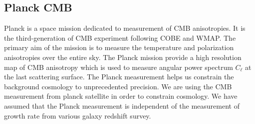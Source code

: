 \subsection{Planck CMB}
Planck is a space mission dedicated to measurement of CMB anisotropies.  It is the third-generation of CMB experiment following COBE and WMAP. The primary aim of the mission is to measure the temperature and polarization anisotropies over the entire sky. The Planck mission provide a high resolution map of CMB anisotropy which is used to measure angular power spectrum $C_\ell$ at the last scattering surface. The Planck measurement helps us constrain the background cosmology to unprecedented precision. We are using the CMB measurement from planck satellite in order to constrain cosmology. We have assumed that the Planck measurement is independent of the measurement of growth rate from various galaxy redshift survey.

